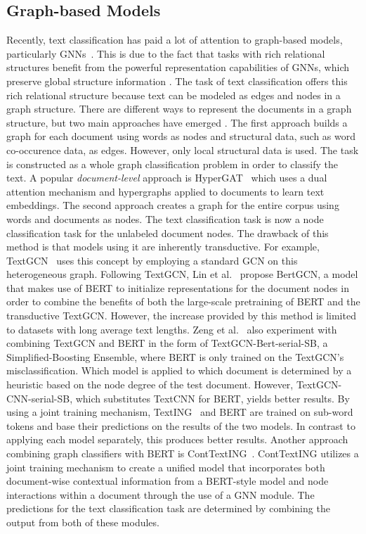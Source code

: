 \documentclass[runningheads]{llncs}
\begin{document}
\subsection{Graph-based Models}
\label{rw-graph}
Recently, text classification has paid a lot of attention to graph-based models, particularly \acp{GNN}~\cite{deng2022aggnn,wang2022induct,shi2022ilgcn}.
This is due to the fact that tasks with rich relational structures benefit from the powerful representation capabilities of GNNs, which preserve global structure information \cite{wang2022induct}.
The task of text classification offers this rich relational structure because text can be modeled as edges and nodes in a graph structure.
There are different ways to represent the documents in a graph structure, but two main approaches have emerged \cite{wang2022induct,shine}.
The first approach builds a graph for each document using words as nodes and structural data, such as word co-occurence data, as edges. However, only local structural data is used.
The task is constructed as a whole graph classification problem in order to classify the text.
A popular \emph{document-level} approach is HyperGAT~\cite{ding-etal-2020-hypergat} which uses a dual attention mechanism and hypergraphs applied to documents to learn text embeddings.
The second approach creates a graph for the entire corpus using words and documents as nodes.
The text classification task is now a node classification task for the unlabeled document nodes.
The drawback of this method is that models using it are inherently transductive. 
For example, TextGCN~\cite{TextGCN_Yao_Mao_Luo_2019} uses this concept by employing a standard \ac{GCN} on this heterogeneous graph.
Following TextGCN, Lin et al.~\cite{lin2021bertgcn} propose BertGCN, a model that makes use of BERT to initialize representations for the document nodes in order to combine the benefits of both the large-scale pretraining of BERT and the transductive TextGCN.
However, the increase provided by this method is limited to datasets with long average text lengths.
Zeng et al.~\cite{zeng2022simplified} also experiment with combining TextGCN and BERT in the form of TextGCN-Bert-serial-SB, a Simplified-Boosting Ensemble, where BERT is only trained on the TextGCN's misclassification.
Which model is applied to which document is determined by a heuristic based on the node degree of the test document.
However, TextGCN-CNN-serial-SB, which substitutes TextCNN for BERT, yields better results.
By using a joint training mechanism, TextING~\cite{zhang2020TextING} and BERT are trained on sub-word tokens and base their predictions on the results of the two models. 
In contrast to applying each model separately, this produces better results.
Another approach combining graph classifiers with BERT is ContTextING~\cite{huang-etal-2022-contexting}. 
ContTextING utilizes a joint training mechanism to create a unified model that incorporates both document-wise contextual information from a BERT-style model and node interactions within a document through the use of a GNN module. The predictions for the text classification task are determined by combining the output from both of these modules.
\end{document}
